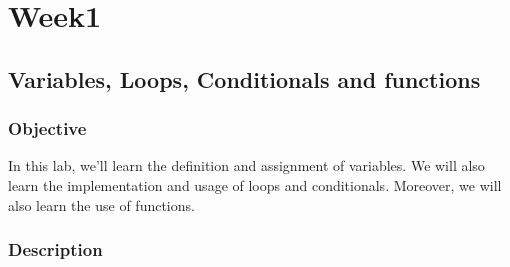 \documentclass[11pt,fleqn]{book} %
\begin{document}


\pagestyle{empty} %

\tableofcontents %

\cleardoublepage %


\part{Week1}



\chapter{Variables, Loops, Conditionals and functions}

\section{Objective}
In this lab, we'll learn the definition and assignment of variables. We will also learn the implementation and usage of loops and conditionals.
Moreover, we will also learn the use of functions.
\section{Description} 
\end{document}
